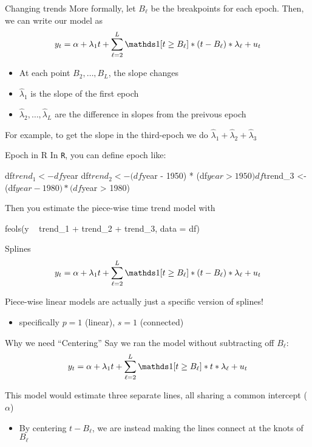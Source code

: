\documentclass[aspectratio=169,t,11pt,table]{beamer}
\begin{document}
\begin{frame}{Changing trends}
  More formally, let $B_\ell$ be the breakpoints for each epoch. Then, we can write our model as 
  $$
    y_t = \alpha + \lambda_1 t + \sum_{\ell = 2}^L \one{t \geq B_\ell} * (t - B_\ell) * \lambda_\ell + u_t
  $$
  \begin{itemize}
    \item At each point $B_2, \dots, B_L$, the slope changes
    \item $\hat{\lambda}_1$ is the slope of the first epoch
    \item $\hat{\lambda}_2, \dots, \hat{\lambda}_L$ are the difference in slopes from the preivous epoch
  \end{itemize}

  \bigskip
  For example, to get the slope in the third-epoch we do $\hat{\lambda}_1 + \hat{\lambda}_2 + \hat{\lambda}_3$
\end{frame}

\begin{frame}[fragile]{Epoch in R}
  In \texttt{R}, you can define epoch like:
  \begin{codeblock}
df$trend_1 <- df$year
df$trend_2 <- (df$year - 1950) * (df$year > 1950)
df$trend_3 <- (df$year - 1980) * (df$year > 1980)
  \end{codeblock}

  Then you estimate the piece-wise time trend model with
  \begin{codeblock}
feols(y ~ trend_1 + trend_2 + trend_3, data = df)
  \end{codeblock}
\end{frame}


\begin{frame}{Splines}
  \vspace*{-\bigskipamount}
  $$
    y_t = \alpha + \lambda_1 t + \sum_{\ell = 2}^L \one{t \geq B_\ell} * (t - B_\ell) * \lambda_\ell + u_t
  $$
  
  \bigskip
  Piece-wise linear models are actually just a specific version of splines! 
  \begin{itemize}
    \item specifically $p = 1$ (linear), $s = 1$ (connected)
  \end{itemize}
\end{frame}

\begin{frame}{Why we need ``Centering''}
  Say we ran the model without subtracting off $B_\ell$:
  $$
    y_t = \alpha + \lambda_1 t + \sum_{\ell = 2}^L \one{t \geq B_\ell} * t * \lambda_\ell + u_t
  $$

  \bigskip
  This model would estimate three separate lines, all sharing a common intercept ($\alpha$)
  \begin{itemize}
    \item By centering $t - B_\ell$, we are instead making the lines connect at the knots of $B_\ell$
  \end{itemize}
\end{frame}
\end{document}
